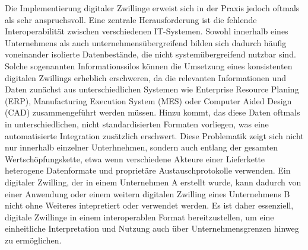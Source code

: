 


Die Implementierung digitaler Zwillinge erweist sich in der Praxis jedoch oftmals als sehr anspruchsvoll.
Eine zentrale Herausforderung ist die fehlende Interoperabilität zwischen verschiedenen IT-Systemen.
Sowohl innerhalb eines Unternehmens als auch unternehmensübergreifend bilden sich dadurch häufig voneinander isolierte Datenbestände, die nicht systemübergreifend nutzbar sind.
Solche sogenannten Informationssilos können die Umsetzung eines konsistenten digitalen Zwillings erheblich erschweren, da die relevanten Informationen und Daten zunächst aus unterschiedlichen Systemen wie Enterprise Resource Planing (ERP), Manufacturing Execution System (MES) oder Computer Aided Design (CAD) zusammengeführt werden müssen.
Hinzu kommt, das diese Daten oftmals in unterschiedlichen, nicht standardisierten Formaten vorliegen, was eine automatisierte Integration zusätzlich erschwert.
Diese Problematik zeigt sich nicht nur innerhalb einzelner Unterhnehmen, sondern auch entlang der gesamten Wertschöpfungskette, etwa wenn verschiedene Akteure einer Lieferkette heterogene Datenformate und proprietäre Austauschprotokolle verwenden.
Ein digitaler Zwilling, der in einem Unternehmen A erstellt wurde, kann dadurch von einer Anwendung oder einem weitern digitalen Zwilling eines Unternehmens B nicht ohne Weiteres intepretiert oder verwendet werden.
Es ist daher essenziell, digitale Zwillinge in einem interoperablen Format bereitzustellen, um eine einheitliche Interpretation und Nutzung auch über Unternehmensgrenzen hinweg zu ermöglichen.
\cite{DTandAASConceptsInI4.0}


